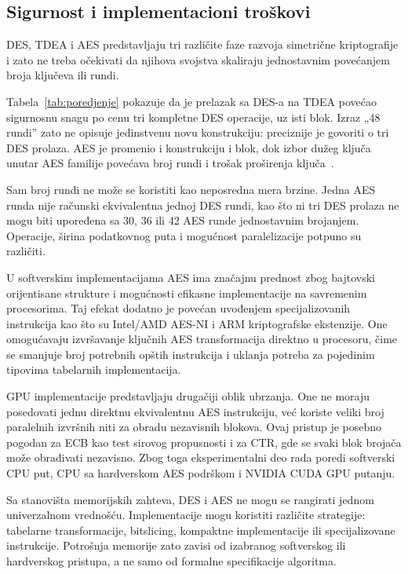 \subsection{Sigurnost i implementacioni troškovi}
\label{subsec:poredjenje_sigurnost}

DES, TDEA i AES predstavljaju tri različite faze razvoja simetrične
kriptografije i zato ne treba očekivati da njihova svojstva skaliraju
jednostavnim povećanjem broja ključeva ili rundi.

Tabela~\ref{tab:poredjenje} pokazuje da je prelazak sa DES-a na TDEA
povećao sigurnosnu snagu po cenu tri kompletne DES operacije, uz isti
blok. Izraz „48 rundi” zato ne opisuje jedinstvenu novu konstrukciju:
preciznije je govoriti o tri DES prolaza. AES je promenio i konstrukciju
i blok, dok izbor dužeg ključa unutar AES familije povećava broj rundi
i trošak proširenja ključa~\cite{fips197-2023}.

Sam broj rundi ne može se koristiti kao neposredna mera brzine.
Jedna AES runda nije računski ekvivalentna jednoj DES rundi, kao što
ni tri DES prolaza ne mogu biti upoređena sa 30, 36 ili 42 AES runde
jednostavnim brojanjem. Operacije, širina podatkovnog puta i mogućnost
paralelizacije potpuno su različiti.

U softverskim implementacijama AES ima značajnu prednost zbog
bajtovski orijentisane strukture i mogućnosti efikasne implementacije
na savremenim procesorima. Taj efekat dodatno je povećan uvođenjem
specijalizovanih instrukcija kao što su Intel/AMD AES-NI i ARM
kriptografske ekstenzije. One omogućavaju izvršavanje ključnih AES
transformacija direktno u procesoru, čime se smanjuje broj potrebnih
opštih instrukcija i uklanja potreba za pojedinim tipovima tabelarnih
implementacija.

GPU implementacije predstavljaju drugačiji oblik ubrzanja. One ne
moraju posedovati jednu direktnu ekvivalentnu AES instrukciju, već
koriste veliki broj paralelnih izvršnih niti za obradu nezavisnih
blokova. Ovaj pristup je posebno pogodan za ECB kao test sirovog
propusnosti i za CTR, gde se svaki blok brojača može obrađivati
nezavisno. Zbog toga eksperimentalni deo rada poredi softverski
CPU put, CPU sa hardverskom AES podrškom i NVIDIA CUDA GPU putanju.

Sa stanovišta memorijskih zahteva, DES i AES ne mogu se rangirati
jednom univerzalnom vrednošću. Implementacije mogu koristiti različite
strategije: tabelarne transformacije, bitslicing, kompaktne
implementacije ili specijalizovane instrukcije. Potrošnja memorije
zato zavisi od izabranog softverskog ili hardverskog pristupa, a ne
samo od formalne specifikacije algoritma.

